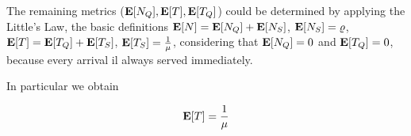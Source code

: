 The remaining metrics ($\mathbf{E}[N_{Q}],\mathbf{E}[T],\mathbf{E}[T_{Q}]$) could be determined by applying the Little's Law, the basic definitions 
$\mathbf{E}[N]=\mathbf{E}[N_{Q}]+\mathbf{E}[N_{S}]$, 
$\mathbf{E}[N_{S}]=\varrho$, 
$\mathbf{E}[T]=\mathbf{E}[T_{Q}]+\mathbf{E}[T_{S}]$,
$\mathbf{E}[T_{S}]=\frac{1}{\mu}$,
considering that $\mathbf{E}[N_{Q}]=0$ and $\mathbf{E}[T_{Q}]=0$, because every arrival il always served immediately.

In particular we obtain

\begin{equation}
\label{eqn:M-M-inf-Mean-Response-Time}
\expected{T} = \frac{1}{\mu}
\end{equation}

